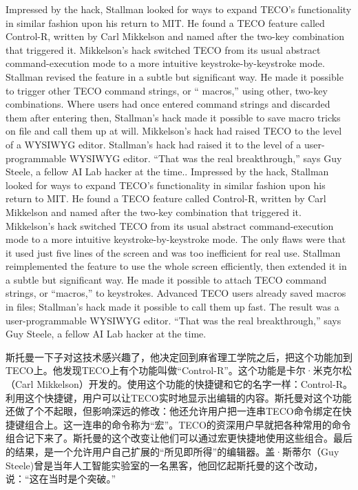 \ifdefined\eng
\ifdefined\vone
Impressed by the hack, Stallman looked for ways to expand TECO's functionality in similar fashion upon his return to MIT. He found a TECO feature called Control-R, written by Carl Mikkelson and named after the two-key combination that triggered it. Mikkelson's hack switched TECO from its usual abstract command-execution mode to a more intuitive keystroke-by-keystroke mode. Stallman revised the feature in a subtle but significant way. He made it possible to trigger other TECO command strings, or `` macros,'' using other, two-key combinations. Where users had once entered command strings and discarded them after entering then, Stallman's hack made it possible to save macro tricks on file and call them up at will. Mikkelson's hack had raised TECO to the level of a WYSIWYG editor. Stallman's hack had raised it to the level of a user-programmable WYSIWYG editor. ``That was the real breakthrough,'' says Guy Steele, a fellow AI Lab hacker at the time..
\fi
\ifdefined\vtwo
Impressed by the hack, Stallman looked for ways to expand TECO's functionality in similar fashion upon his return to MIT. He found a TECO feature called Control-R, written by Carl Mikkelson and named after the two-key combination that triggered it. Mikkelson's hack switched TECO from its usual abstract command-execution mode to a more intuitive keystroke-by-keystroke mode. The only flaws were that it used just five lines of the screen and was too inefficient for real use. Stallman reimplemented the feature to use the whole screen efficiently, then extended it in a subtle but significant way. He made it possible to attach TECO command strings, or ``macros,'' to keystrokes. Advanced TECO users already saved macros in files; Stallman's hack made it possible to call them up fast. The result was a user-programmable WYSIWYG editor. ``That was the real breakthrough,'' says Guy Steele, a fellow AI Lab hacker at the time.
\fi
\fi

\ifdefined\chs
\ifdefined\vone
斯托曼一下子对这技术感兴趣了，他决定回到麻省理工学院之后，把这个功能加到TECO上。他发现TECO上有个功能叫做``Control-R''。这个功能是卡尔·米克尔松（Carl Mikkelson）开发的。使用这个功能的快捷键和它的名字一样：Control-R。利用这个快捷键，用户可以让TECO实时地显示出编辑的内容。斯托曼对这个功能还做了个不起眼，但影响深远的修改：他还允许用户把一连串TECO命令绑定在快捷键组合上。这一连串的命令称为``宏''。TECO的资深用户早就把各种常用的命令组合记下来了。斯托曼的这个改变让他们可以通过宏更快捷地使用这些组合。最后的结果，是一个允许用户自己扩展的``所见即所得''的编辑器。盖·斯蒂尔（Guy Steele)曾是当年人工智能实验室的一名黑客，他回忆起斯托曼的这个改动，说：``这在当时是个突破。''


